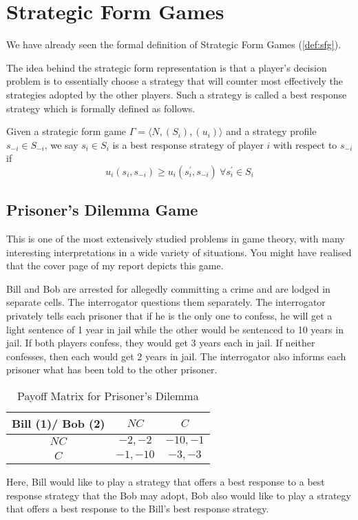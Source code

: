 \section{Strategic Form Games}{\label{sec:sfg}}
We have already seen the formal definition of Strategic Form Games (\ref{def:sfg}).

The idea behind the strategic form representation is that a player's decision problem is to essentially choose a strategy that will counter most effectively the strategies adopted by the other players.
Such a strategy is called a best response strategy which is formally defined as follows.
\begin{defn}
    Given a strategic form game $\Gamma = \langle N,(S_i),(u_i)\rangle$ and a strategy profile $s_{-i} \in S_{-i}$, we say $s_i \in S_{i}$ is a best response strategy of player $i$ with respect to $s_{-i}$ if
    \[u_i(s_i,s_{-i})\geq u_i(s^\prime_i,s_{-i})\ \forall s^\prime_i \in S_i\]
\end{defn}
\subsection{Prisoner's Dilemma Game}
This is one of the most extensively studied problems in game theory, with many interesting interpretations in a wide variety of situations.
You might have realised that the cover page of my report depicts this game.

Bill and Bob are arrested for allegedly committing a crime and are lodged in separate cells.
The interrogator questions them separately.
The interrogator privately tells each prisoner that if he is the only one to confess, he will get a light sentence of 1 year in jail while the other would be sentenced to 10 years in jail.
If both players confess, they would get 3 years each in jail.
If neither confesses, then each would get 2 years in jail.
The interrogator also informs each prisoner what has been told to the other prisoner.
\begin{table}[h]{\label{tab:pd}}
\centering
	\begin{tabular}{ |c|c|c| } 
        \hline
        Bill (1)/ Bob (2) & $NC$ & $C$\\\hline
        $NC$ & $-2,-2$ & $-10,-1$ \\\hline
        $C$ & $-1,-10$ & $-3,-3$\\\hline
    \end{tabular}
    \caption{Payoff Matrix for Prisoner's Dilemma}
\end{table}
Here, Bill would like to play a strategy that offers a best response to a best response strategy that the Bob may adopt, Bob also would like to play a strategy that offers a best response to the Bill's best response strategy.


